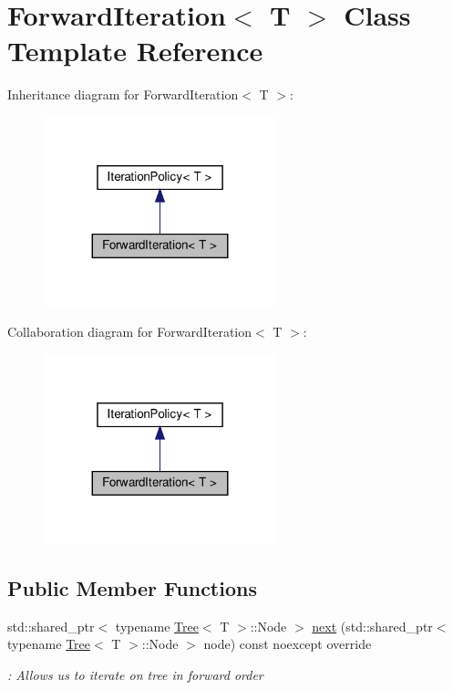 \hypertarget{classForwardIteration}{}\section{Forward\+Iteration$<$ T $>$ Class Template Reference}
\label{classForwardIteration}


Inheritance diagram for Forward\+Iteration$<$ T $>$\+:
\nopagebreak
\begin{figure}[H]
\begin{center}
\leavevmode
\includegraphics[width=191pt]{classForwardIteration__inherit__graph}
\end{center}
\end{figure}


Collaboration diagram for Forward\+Iteration$<$ T $>$\+:
\nopagebreak
\begin{figure}[H]
\begin{center}
\leavevmode
\includegraphics[width=191pt]{classForwardIteration__coll__graph}
\end{center}
\end{figure}
\subsection*{Public Member Functions}
\begin{DoxyCompactItemize}
\item 
std\+::shared\+\_\+ptr$<$ typename \hyperlink{classTree}{Tree}$<$ T $>$\+::Node $>$ \hyperlink{classForwardIteration_aec16f756354bad563a57da6157448203}{next} (std\+::shared\+\_\+ptr$<$ typename \hyperlink{classTree}{Tree}$<$ T $>$\+::Node $>$ node) const noexcept override
\begin{DoxyCompactList}\small\item\em \+: Allows us to iterate on tree in forward order \end{DoxyCompactList}\end{DoxyCompactItemize}


